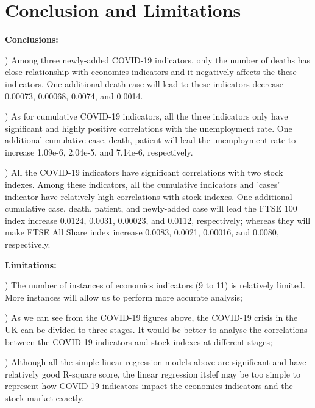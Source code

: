 \documentclass[12pt, a4paper]{report}
\begin{document}
\section{Conclusion and Limitations}
\textbf{Conclusions:}\par
{}) Among three newly-added COVID-19 indicators, only the number of deaths has close
relationship with economics indicators and it negatively affects the these indicators.
One additional death case will lead to these indicators decrease 0.00073, 0.00068, 0.0074, and 0.0014.\par
{}) As for cumulative COVID-19 indicators, all the three indicators only have significant and highly positive correlations
with the unemployment rate. One additional cumulative case, death, patient will lead the unemployment rate to increase 1.09e-6, 2.04e-5, and 7.14e-6, respectively.\par
{}) All the COVID-19 indicators have significant correlations with two stock indexes. Among these indicators, all the cumulative indicators and 
'cases' indicator have relatively high correlations with stock indexes. One additional cumulative case, death, patient, and newly-added case will lead the 
FTSE 100 index increase 0.0124, 0.0031, 0.00023, and 0.0112, respectively; whereas they will make FTSE All Share index increase 0.0083, 0.0021, 0.00016, and 0.0080, 
respectively.\par

\hspace*{\fill}

\noindent
\textbf{Limitations:}\par
{}) The number of instances of economics indicators (9 to 11) is relatively limited. More instances will allow us to perform more accurate analysis;\par
{}) As we can see from the COVID-19 figures above, the COVID-19 crisis in the UK can be divided to three stages. It would be 
better to analyse the correlations between the COVID-19 indicators and stock indexes at different stages;\par
{}) Although all the simple linear regression models above are significant and have relatively good R-square score, the linear regression itslef may be 
too simple to represent how COVID-19 indicators impact the economics indicators and the stock market exactly.\par
\end{document}
